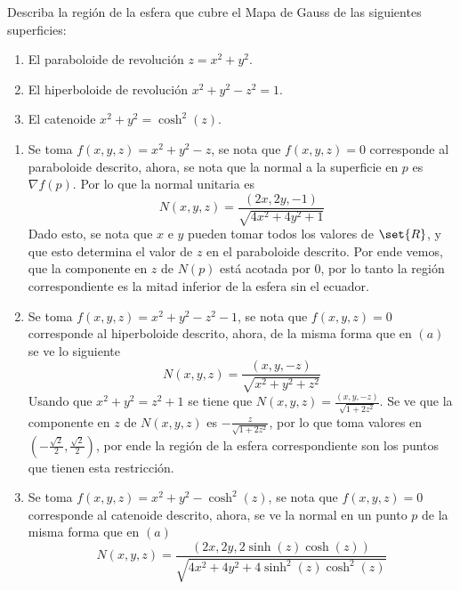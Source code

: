 \documentclass{homework}
\begin{document}
\begin{prob}
    Describa la región de la esfera que cubre el Mapa de Gauss de las siguientes superficies:
    \begin{enumerate}
        \item El paraboloide de revolución \(z=x^2+y^2\).
        \item El hiperboloide de revolución \(x^2+y^2-z^2=1\).
        \item El catenoide \(x^2+y^2=\cosh^2(z)\).
    \end{enumerate}
\end{prob}

\begin{sol}
    \begin{enumerate}
        \item Se toma \(f(x,y,z)=x^2+y^2-z\), se nota que \(f(x,y,z)=0\) corresponde al paraboloide descrito, ahora, se nota que la normal a la superficie en \(p\) es \(\nabla f(p)\). Por lo que la normal unitaria es
        \begin{equation*}
            N(x,y,z)=\frac{(2x,2y,-1)}{\sqrt{4x^2+4y^2+1}}
        \end{equation*}
        Dado esto, se nota que \(x\) e \(y\) pueden tomar todos los valores de \(\set{R}\), y que esto determina el valor de \(z\) en el paraboloide descrito. Por ende vemos, que la componente en \(z\) de \(N(p)\) está acotada por \(0\), por lo tanto la región correspondiente es la mitad inferior de la esfera sin el ecuador.
        \item Se toma \(f(x,y,z)=x^2+y^2-z^2-1\), se nota que \(f(x,y,z)=0\) corresponde al hiperboloide descrito, ahora, de la misma forma que en \((a)\) se ve lo siguiente
        \begin{equation*}
            N(x,y,z)=\frac{(x,y,-z)}{\sqrt{x^2+y^2+z^2}}
        \end{equation*}
        Usando que \(x^2+y^2=z^2+1\) se tiene que \(N(x,y,z)=\frac{(x,y,-z)}{\sqrt{1+2z^2}}\). Se ve que la componente en \(z\) de \(N(x,y,z)\) es \(-\frac{z}{\sqrt{1+2z^2}}\), por lo que toma valores en \((-\frac{\sqrt{2}}2,\frac{\sqrt{2}}2)\), por ende la región de la esfera correspondiente son los puntos que tienen esta restricción.
        \item Se toma \(f(x,y,z)=x^2+y^2-\cosh^2(z)\), se nota que \(f(x,y,z)=0\) corresponde al catenoide descrito, ahora, se ve la normal en un punto \(p\) de la misma forma que en \((a)\)
        \begin{equation*}
            N(x,y,z)=\frac{(2x,2y, 2\sinh(z)\cosh(z))}{\sqrt{4x^2+4y^2+4\sinh^2(z)\cosh^2(z)}}

\end{equation*}
\end{enumerate}
\end{sol}
\end{document}
